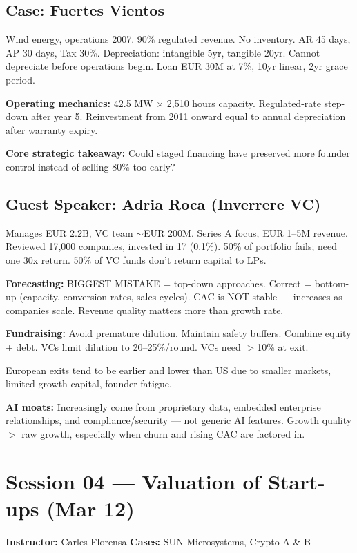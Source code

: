 \documentclass[a4paper,11pt]{article}
\begin{document}
\subsection{Case: Fuertes Vientos}

Wind energy, operations 2007. 90\% regulated revenue. No inventory. AR 45 days, AP 30 days, Tax 30\%. Depreciation: intangible 5yr, tangible 20yr. Cannot depreciate before operations begin. Loan EUR 30M at 7\%, 10yr linear, 2yr grace period.

\textbf{Operating mechanics:} 42.5 MW $\times$ 2,510 hours capacity. Regulated-rate step-down after year 5. Reinvestment from 2011 onward equal to annual depreciation after warranty expiry.

\textbf{Core strategic takeaway:} Could staged financing have preserved more founder control instead of selling 80\% too early?

\subsection{Guest Speaker: Adria Roca (Inverrere VC)}

Manages EUR 2.2B, VC team $\sim$EUR 200M. Series A focus, EUR 1--5M revenue. Reviewed 17,000 companies, invested in 17 (0.1\%). 50\% of portfolio fails; need one 30x return. 50\% of VC funds don't return capital to LPs.

\textbf{Forecasting:} BIGGEST MISTAKE = top-down approaches. Correct = bottom-up (capacity, conversion rates, sales cycles). CAC is NOT stable --- increases as companies scale. Revenue quality matters more than growth rate.

\textbf{Fundraising:} Avoid premature dilution. Maintain safety buffers. Combine equity + debt. VCs limit dilution to 20--25\%/round. VCs need $>$10\% at exit.

European exits tend to be earlier and lower than US due to smaller markets, limited growth capital, founder fatigue.

\textbf{AI moats:} Increasingly come from proprietary data, embedded enterprise relationships, and compliance/security --- not generic AI features. Growth quality $>$ raw growth, especially when churn and rising CAC are factored in.

\newpage

\section{Session 04 --- Valuation of Start-ups (Mar 12)}
\textbf{Instructor:} Carles Florensa \hfill \textbf{Cases:} SUN Microsystems, Crypto A \& B
\end{document}
